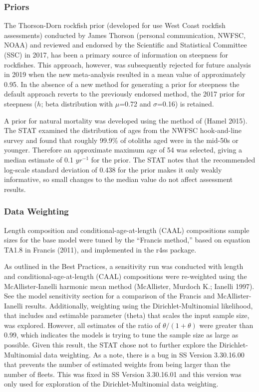 \documentclass[
  english,
  a4paper,
]{article}
\begin{document}
\hypertarget{priors}{%
\subsubsection{Priors}\label{priors}}

The Thorson-Dorn rockfish prior (developed for use West Coast rockfish assessments) conducted by James Thorson (personal communication, NWFSC, NOAA) and reviewed and endorsed by the Scientific and Statistical Committee (SSC) in 2017, has been a primary source of information on steepness for rockfishes. This approach, however, was subsequently rejected for future analysis in 2019 when the new meta-analysis resulted in a mean value of approximately 0.95. In the absence of a new method for generating a prior for steepness the default approach reverts to the previously endorsed method, the 2017 prior for steepness (\(h\); beta distribution with \(\mu\)=0.72 and \(\sigma\)=0.16) is retained.

A prior for natural mortality was developed using the method of (Hamel 2015). The STAT examined the distribution of ages from the NWFSC hook-and-line survey and found that roughly 99.9\% of otoliths aged were in the mid-50s or younger. Therefore an approximate maximum age of 54 was selected, giving a median estimate of 0.1 \(yr^{-1}\) for the prior. The STAT notes that the recommended log-scale standard deviation of 0.438 for the prior makes it only weakly informative, so small changes to the median value do not affect assessment results.

\hypertarget{data-weighting}{%
\subsubsection{Data Weighting}\label{data-weighting}}

Length composition and conditional-age-at-length (CAAL) compositions sample sizes for
the base model were tuned by the ``Francis method,'' based on equation TA1.8 in Francis
(2011), and implemented in the r4ss package.

As outlined in the Best Practices, a sensitivity run was conducted with length and
conditional-age-at-length (CAAL) compositions were re-weighted using the
McAllister-Ianelli harmonic mean method (McAllister, Murdoch K.; Ianelli 1997). See the model sensitivity section for a comparison of the Francis and McAllister-Ianelli results. Additionally, weighting
using the Dirichlet-Multinomial likelihood, that includes and estimable parameter (theta)
that scales the input sample size, was explored. However, all estimates of the ratio of
\(\theta/(1+\theta)\) were greater than 0.99, which indicates the models is trying to tune
the sample size as large as possible. Given this result, the STAT chose not to further explore
the Dirichlet-Multinomial data weighting. As a note, there is a bug in SS Version 3.30.16.00 that
prevents the number of estimated weights from being larger than the number of fleets. This was
fixed in SS Version 3.30.16.01 and this version was only used for exploration of the Dirichlet-Multinomial data weighting.
\end{document}
